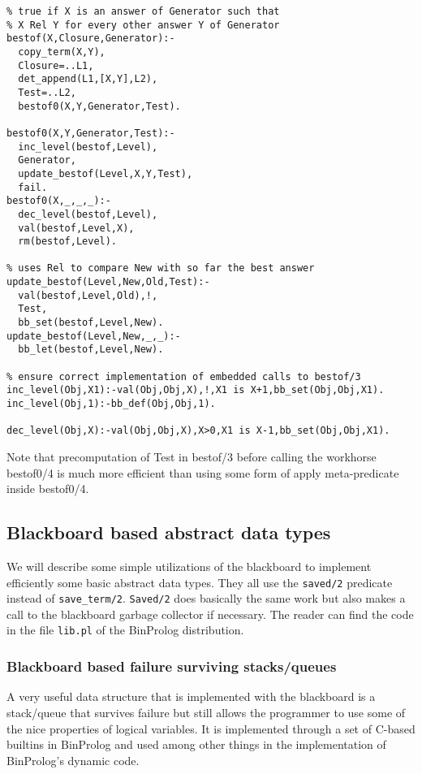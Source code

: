 \documentclass{article}
\begin{document}
\begin{verbatim}
% true if X is an answer of Generator such that
% X Rel Y for every other answer Y of Generator
bestof(X,Closure,Generator):-
  copy_term(X,Y),
  Closure=..L1,
  det_append(L1,[X,Y],L2),
  Test=..L2,
  bestof0(X,Y,Generator,Test).

bestof0(X,Y,Generator,Test):-
  inc_level(bestof,Level),
  Generator,
  update_bestof(Level,X,Y,Test),
  fail.
bestof0(X,_,_,_):-
  dec_level(bestof,Level),
  val(bestof,Level,X),
  rm(bestof,Level).

% uses Rel to compare New with so far the best answer
update_bestof(Level,New,Old,Test):-
  val(bestof,Level,Old),!,
  Test,
  bb_set(bestof,Level,New).
update_bestof(Level,New,_,_):-
  bb_let(bestof,Level,New).

% ensure correct implementation of embedded calls to bestof/3
inc_level(Obj,X1):-val(Obj,Obj,X),!,X1 is X+1,bb_set(Obj,Obj,X1).
inc_level(Obj,1):-bb_def(Obj,Obj,1).

dec_level(Obj,X):-val(Obj,Obj,X),X>0,X1 is X-1,bb_set(Obj,Obj,X1).
\end{verbatim}

{\flushleft Note} that precomputation of Test in bestof/3 before calling the
workhorse bestof0/4 is much more efficient than using some form
of apply meta-predicate inside bestof0/4.

\subsection{Blackboard based abstract data types}

We will describe some simple utilizations of the blackboard to implement efficiently some basic abstract data types.
They all use the {\tt saved/2} predicate instead of {\tt save\_term/2}. 
{\tt Saved/2} does
basically the same work but also makes a call to the blackboard garbage
collector if necessary. The reader can find the code in the file {\tt lib.pl}
of the BinProlog distribution.

\subsubsection{Blackboard based failure surviving stacks/queues}

A very useful data structure that is implemented with the blackboard is
a stack/queue that survives failure but still allows the programmer to use some of the nice properties of logical variables. It is implemented through a set of C-based builtins in BinProlog  and used among other things
in the implementation of BinProlog's dynamic code.
\end{document}
